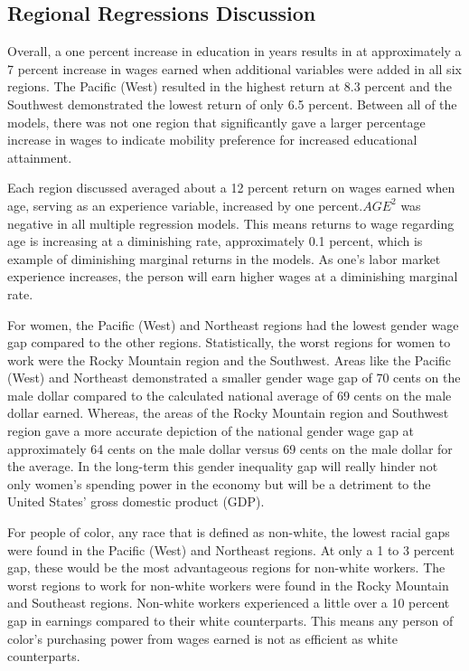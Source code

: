 \documentclass[12pt, English]{article}
\begin{document}
\subsection{Regional Regressions Discussion}
Overall, a one percent increase in education in years results in at approximately a 7 percent increase in wages earned when additional variables were added in all six regions. The Pacific (West) resulted in the highest return at 8.3 percent and the Southwest demonstrated the lowest return of only 6.5  percent. Between all of the models, there was not one region that significantly gave a larger percentage increase in wages to indicate mobility preference for increased educational attainment. 

Each region discussed averaged about a 12 percent return on wages earned when age, serving as an experience variable, increased by one percent.\begin{math} AGE^2 \end{math} was negative in all multiple regression models. This means returns to wage regarding age is increasing at a diminishing rate, approximately 0.1 percent, which is example of diminishing marginal returns in the models. As one’s labor market experience increases, the person will earn higher wages at a diminishing marginal rate.

For women, the Pacific (West) and Northeast regions had the lowest gender wage gap compared to the other regions. Statistically, the worst regions for women to work were the Rocky Mountain region and the Southwest. Areas like the Pacific (West) and Northeast demonstrated a smaller gender wage gap of 70 cents on the male dollar compared to the calculated national average of 69 cents on the male dollar earned. Whereas, the areas of the Rocky Mountain region and Southwest region gave a more accurate depiction of the national gender wage gap at approximately 64 cents on the male dollar versus 69 cents on the male dollar for the average. In the long-term this gender inequality gap will really hinder not only women's spending power in the economy but will be a detriment to the United States' gross domestic product (GDP).

For people of color, any race that is defined as non-white, the lowest racial gaps were found in the Pacific (West) and Northeast regions. At only a 1 to 3 percent gap, these would be the most advantageous regions for non-white workers. The worst regions to work for non-white workers were found in the Rocky Mountain and Southeast regions. Non-white workers experienced a little over a 10 percent gap in earnings compared to their white counterparts. This means any person of color's purchasing power from wages earned is not as efficient as white counterparts. 
\end{document}
